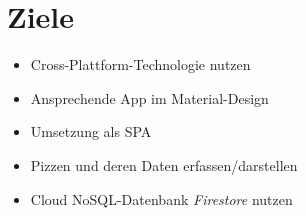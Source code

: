 \section{Ziele}

\begin{itemize}
    \itemsep-0.4em
    \item Cross-Plattform-Technologie nutzen
    \item Ansprechende App im Material-Design
    \item Umsetzung als \ac{SPA}
    \item Pizzen und deren Daten erfassen/darstellen
    \item Cloud NoSQL-Datenbank \textit{Firestore} nutzen
\end{itemize}

\newpage
